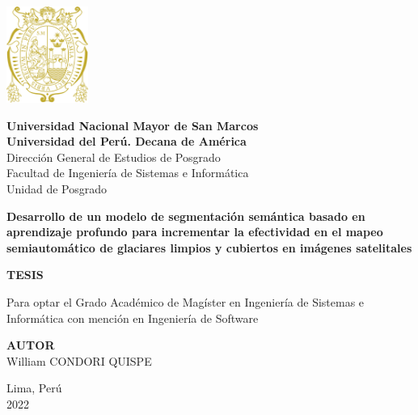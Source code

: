 \begin{titlepage}
    \begin{center}
        \includegraphics[width=0.2\textwidth]{Images/Unmsm.png}
    \end{center}

    \begin{center}
        {\Large \bf Universidad Nacional Mayor de San Marcos}\\[0.3cm]
        {\large \bf Universidad del Perú. Decana de América}\\[0.5cm]
        {\large Dirección General de Estudios de Posgrado}\\[0.3cm]
        {\large Facultad de Ingeniería de Sistemas e Informática}\\[0.3cm]
        {\large Unidad de Posgrado}

        \vspace{1.5cm}
        
        \large{\bf  Desarrollo de un modelo de segmentación semántica basado en aprendizaje profundo para incrementar la efectividad en el mapeo semiautomático de glaciares limpios y cubiertos en imágenes satelitales}

        \vspace{1.5cm}

        {\large \bf TESIS}

        {\large Para optar el Grado Académico de Magíster en Ingeniería de Sistemas e Informática con mención en Ingeniería de Software}

        \vspace{1.5cm}

        {\large \bf AUTOR}\\[0cm]
        {\large William CONDORI QUISPE}

        \vspace{3.5cm}

        {\large Lima, Perú}\\[0cm]
        {2022}
    \end{center}
\end{titlepage}